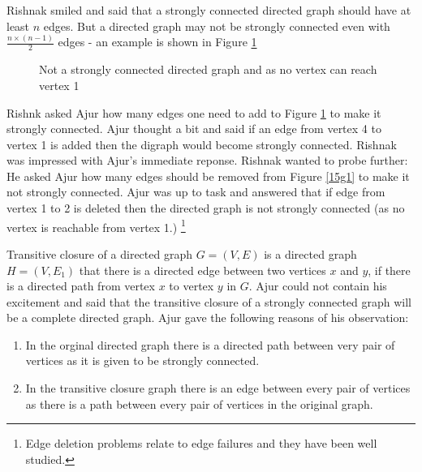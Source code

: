 Rishnak smiled and said that a strongly connected directed graph should have at least $n$ edges. But a directed graph may not be strongly connected even with $\frac{n \times (n-1)}{2}$ edges - an example is shown in Figure \ref{15g3}
\begin{figure}
\begin{center}
\caption{ Not a strongly connected directed graph and as no vertex can reach vertex 1}\label{15g3}
\end{center}
\end{figure}

Rishnk asked Ajur how many edges one need to add to Figure \ref{15g3} to make it strongly connected. Ajur thought a bit and said if an edge from vertex 4 to vertex 1 is added then the digraph would become strongly connected. Rishnak was impressed with Ajur's immediate reponse. Rishnak wanted to probe further: He asked Ajur how many edges should be removed from Figure \ref{15g1} to make it not strongly connected. Ajur was up to task and answered that if edge from vertex 1 to 2 is deleted then the directed graph is not strongly connected (as no vertex is reachable from vertex 1.) \footnote{Edge deletion problems relate to edge failures and they have been well studied.}

Transitive closure of a directed graph $G=(V,E)$ is a directed graph $H=(V,E_1)$ that there is a directed edge between two vertices $x$ and $y$, if there is a directed path from vertex $x$ to vertex $y$ in $G$. Ajur could not contain his excitement and said that the transitive closure of a strongly connected graph will be a complete directed graph. Ajur gave the following reasons of his observation:
\begin{enumerate}
    \item In the orginal directed graph there is a directed path between very pair of vertices as it is given to be strongly connected.
    \item In the transitive closure graph there is an edge between every pair of vertices as there is a path between every pair of vertices in the original graph.
\end{enumerate}

